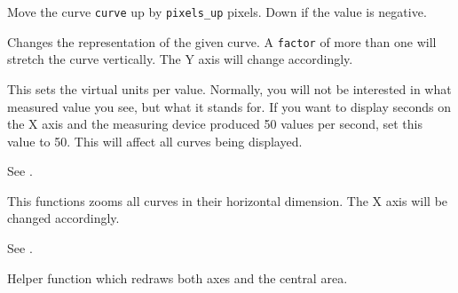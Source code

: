 \label{wxplotwindowmove}


Move the curve {\tt curve} up by {\tt pixels\_up} pixels. Down if the
value is negative.

\label{wxplotwindowenlarge}


Changes the representation of the given curve. A {\tt factor} of more than
one will stretch the curve vertically. The Y axis will change accordingly.

\label{wxplotwindowsetunitspervalue}


This sets the virtual units per value. Normally, you will not be interested in
what measured value you see, but what it stands for. If you want to display seconds
on the X axis and the measuring device produced 50 values per second, set this
value to 50. This will affect all curves being displayed.

\label{wxplotwindowgetunitspervalue}


See .

\label{wxplotwindowsetzoom}


This functions zooms all curves in their horizontal dimension. The X axis will
be changed accordingly.

\label{wxplotwindowgetzoom}


See .

\label{wxplotwindowredraweverything}


Helper function which redraws both axes and the central area.

\label{wxplotwindowredrawxaxis}

